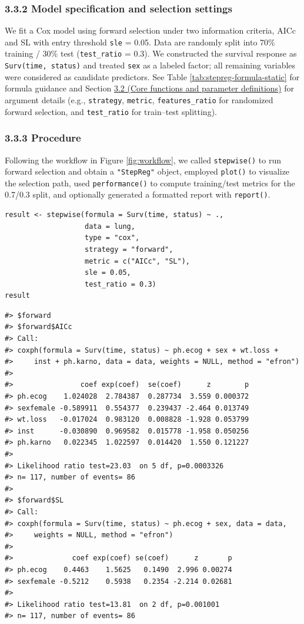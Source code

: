 \subsubsection{3.3.2 Model specification and selection settings}\label{model-specification-and-selection-settings}

We fit a Cox model using forward selection under two information criteria, AICc and SL with entry threshold \texttt{sle} = 0.05. Data are randomly split into 70\% training / 30\% test (\texttt{test\_ratio} = 0.3). We constructed the survival response as \texttt{Surv(time,\ status)} and treated \texttt{sex} as a labeled factor; all remaining variables were considered as candidate predictors. See Table \ref{tab:stepreg-formula-static} for formula guidance and Section \hyperref[usage]{3.2 (Core functions and parameter definitions)} for argument details (e.g., \texttt{strategy}, \texttt{metric}, \texttt{features\_ratio} for randomized forward selection, and \texttt{test\_ratio} for train--test splitting).

\subsubsection{3.3.3 Procedure}\label{procedure}

Following the  workflow in Figure \ref{fig:workflow}, we called \texttt{stepwise()} to run forward selection and obtain a \texttt{"StepReg"} object, employed \texttt{plot()} to visualize the selection path, used \texttt{performance()} to compute training/test metrics for the 0.7/0.3 split, and optionally generated a formatted report with \texttt{report()}.

\begin{verbatim}
result <- stepwise(formula = Surv(time, status) ~ .,
                   data = lung,
                   type = "cox",
                   strategy = "forward",
                   metric = c("AICc", "SL"),
                   sle = 0.05,
                   test_ratio = 0.3)
result
\end{verbatim}

\begin{verbatim}
#> $forward
#> $forward$AICc
#> Call:
#> coxph(formula = Surv(time, status) ~ ph.ecog + sex + wt.loss + 
#>     inst + ph.karno, data = data, weights = NULL, method = "efron")
#> 
#>                coef exp(coef)  se(coef)      z        p
#> ph.ecog    1.024028  2.784387  0.287734  3.559 0.000372
#> sexfemale -0.589911  0.554377  0.239437 -2.464 0.013749
#> wt.loss   -0.017024  0.983120  0.008828 -1.928 0.053799
#> inst      -0.030890  0.969582  0.015778 -1.958 0.050256
#> ph.karno   0.022345  1.022597  0.014420  1.550 0.121227
#> 
#> Likelihood ratio test=23.03  on 5 df, p=0.0003326
#> n= 117, number of events= 86 
#> 
#> $forward$SL
#> Call:
#> coxph(formula = Surv(time, status) ~ ph.ecog + sex, data = data, 
#>     weights = NULL, method = "efron")
#> 
#>              coef exp(coef) se(coef)      z       p
#> ph.ecog    0.4463    1.5625   0.1490  2.996 0.00274
#> sexfemale -0.5212    0.5938   0.2354 -2.214 0.02681
#> 
#> Likelihood ratio test=13.81  on 2 df, p=0.001001
#> n= 117, number of events= 86
\end{verbatim}

